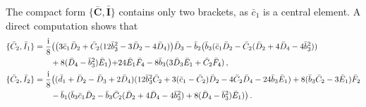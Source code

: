 \documentclass[10pt]{amsart}
\theoremstyle{definition}
\theoremstyle{corollary}
\theoremstyle{remark}
\theoremstyle{conclusion}
\begin{document}
The compact form $\{\bar{\textbf{C}},\bar{\textbf{I}}\}$ contains only two brackets, as $\bar{c}_1$ is a central element. A direct computation shows that 
  \begin{align} 
 \{\bar{C}_2, \bar{I}_1\}&=\frac{{\rm i}}{8}\bigl(\bigl( 3\bar{c}_1 \bar{D}_2+\bar{C}_2(12 \bar{b}_3^2-3\bar{D}_2-4\bar{D}_4)\bigl)\bar{D}_3-\bar{b}_2\bigl( \bar{b}_3( \bar{c}_1 \bar{D}_2-\bar{C}_2(\bar{D}_2+4\bar{D}_4-4\bar{b}_3^2))\nonumber \\
  &  \hskip 0.7 cm+8(\bar{D}_4-\bar{b}_3^2)\bar{E}_1\bigl)+24 \bar{E}_1 \bar{F}_4-8 \bar{b}_3(3 \bar{D}_3\bar{E}_1+\bar{C}_2\bar{F}_4) \, ,\nonumber\\
\{\bar{C}_2, \bar{I}_2\}&=\frac{{\rm i}}{8}\bigl((\bar{d}_1+\bar{D}_2-\bar{D}_3+2\bar{D}_4)(12 \bar{b}_3^2 \bar{C}_2+3(\bar{c}_1-\bar{C}_2)\bar{D}_2-4\bar{C}_2 \bar{D}_4-24 \bar{b}_3 \bar{E}_1)+8(\bar{b}_3 \bar{C}_2-3 \bar{E}_1)\bar{F}_2 \nonumber\\
& \hskip 0.7 cm -\bar{b}_1 (\bar{b}_3 \bar{c}_1 \bar{D}_2-\bar{b}_3 \bar{C}_2(\bar{D}_2+4\bar{D}_4-4\bar{b}_3^2)+8(\bar{D}_4-\bar{b}_3^2)\bar{E}_1) \bigl) \,.
 \end{align}
\end{document}
